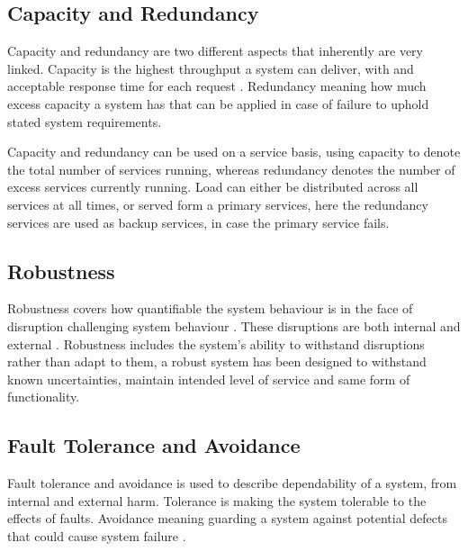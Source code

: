 \subsection{Capacity and Redundancy}
Capacity and redundancy are two different aspects that inherently are very linked. Capacity is the highest throughput a system can deliver, with and acceptable response time for each request \cite[p. 136]{nygard2007release}. Redundancy meaning how much excess capacity a system has that can be applied in case of failure to uphold stated system requirements.

Capacity and redundancy can be used on a service basis, using capacity to denote the total number of services running, whereas redundancy denotes the number of excess services currently running. Load can either be distributed across all services at all times, or served form a primary services, here the redundancy services are used as backup services, in case the primary service fails.

\subsection{Robustness} 
Robustness covers how quantifiable the system behaviour is in the face of disruption challenging system behaviour \cite[p. 10]{sterbenz2010resilience}. These disruptions are both internal and external \cite{omer2013resilience}. Robustness includes the system's ability to withstand disruptions rather than adapt to them, a robust system has been designed to withstand known uncertainties, maintain intended level of service and same form of functionality.


\subsection{Fault Tolerance and Avoidance}
Fault tolerance and avoidance is used to describe dependability of a system, from internal and external harm. Tolerance is making the system tolerable to the effects of faults. Avoidance meaning guarding a system against potential defects that could cause system failure \cite{strigini2012fault}.


